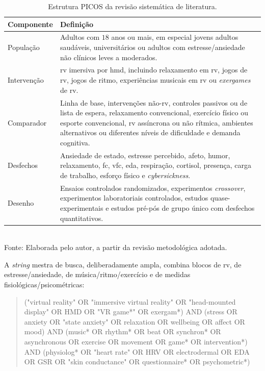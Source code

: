 \begin{table}[H]
\centering
\caption{Estrutura PICOS da revisão sistemática de literatura.}
\label{tab:picos}
\small
\begin{tabularx}{\textwidth}{p{2.4cm}X}
\toprule
\textbf{Componente} & \textbf{Definição} \\
\midrule
População & Adultos com $18$ anos ou mais, em especial jovens adultos saudáveis, universitários ou adultos com estresse/ansiedade não clínicos leves a moderados. \\
Intervenção & \gls{rv} imersiva por \gls{hmd}, incluindo relaxamento em \gls{rv}, jogos de \gls{rv}, jogos de ritmo, experiências musicais em \gls{rv} ou \textit{exergames} de \gls{rv}. \\
Comparador & Linha de base, intervenções não-\gls{rv}, controles passivos ou de lista de espera, relaxamento convencional, exercício físico ou esporte convencional, \gls{rv} assíncrona ou não rítmica, ambientes alternativos ou diferentes níveis de dificuldade e demanda cognitiva. \\
Desfechos & Ansiedade de estado, estresse percebido, afeto, humor, relaxamento, \gls{fc}, \gls{vfc}, \gls{eda}, respiração, cortisol, presença, carga de trabalho, esforço físico e \textit{cybersickness}. \\
Desenho & Ensaios controlados randomizados, experimentos \textit{crossover}, experimentos laboratoriais controlados, estudos quase-experimentais e estudos pré-pós de grupo único com desfechos quantitativos. \\
\bottomrule
\end{tabularx}\\[2pt]
{\footnotesize Fonte: Elaborada pelo autor, a partir da revisão metodológica adotada.}
\end{table}

A \textit{string} mestra de busca, deliberadamente ampla, combina blocos de \gls{rv}, de estresse/ansiedade, de música/ritmo/exercício e de medidas fisiológicas/psicométricas:

\begin{quote}\small\ttfamily
("virtual reality" OR "immersive virtual reality" OR "head-mounted display" OR HMD OR "VR game*" OR exergam*) AND (stress OR anxiety OR "state anxiety" OR relaxation OR wellbeing OR affect OR mood) AND (music* OR rhythm* OR beat OR synchron* OR asynchronous OR exercise OR movement OR game* OR intervention*) AND (physiolog* OR "heart rate" OR HRV OR electrodermal OR EDA OR GSR OR "skin conductance" OR questionnaire* OR psychometric*)
\end{quote}

